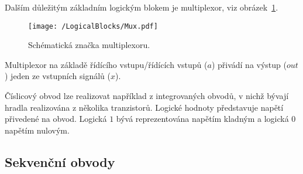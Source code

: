 \documentclass{report}
\begin{document}
Dalším důležitým základním logickým blokem je multiplexor, viz obrázek~\ref{fig:mux}.
\begin{figure}
\centering
\texttt{[image: /LogicalBlocks/Mux.pdf]}
\caption{Schématická značka multiplexoru.}
\label{fig:mux}
\end{figure}
Multiplexor na základě řídícího vstupu/řídících vstupů ($a$) přivádí na výstup ($out$) jeden ze vstupních signálů ($x$). \par
Číslicový obvod lze realizovat například z integrovaných obvodů, v nichž bývají hradla realizována z několika tranzistorů. Logické hodnoty představuje napětí přivedené na obvod. Logická $1$ bývá reprezentována  napětím kladným a logická $0$ napětím nulovým.

\subsection{Sekvenční obvody}\label{sec:sekvencniobvody}
\end{document}
